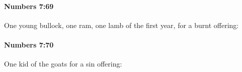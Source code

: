 		\paragraph{Numbers 7:69} %
			\label{NUMBERS-7-69}

			One young bullock, one ram, one lamb of the first year, for a burnt offering:


		\paragraph{Numbers 7:70} %
			\label{NUMBERS-7-70}

			One kid of the goats for a sin offering:



